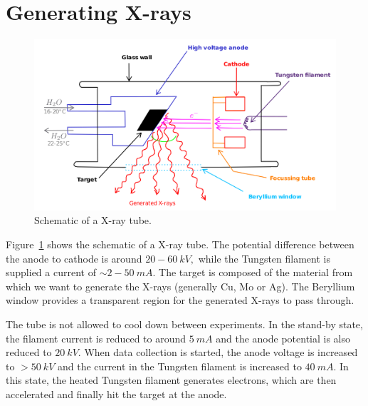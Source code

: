 \section{Generating X-rays}

\begin{figure}
	\centering
	\includegraphics[width=\textwidth]{xray_tube.png}
	\caption{\label{fig:xray_tube}Schematic of a X-ray tube.}
\end{figure}

	Figure~\ref{fig:xray_tube} shows the schematic of a X-ray tube. The potential difference between the anode to cathode is around $20-60~\si{kV},$ while the Tungsten filament is supplied a current of $\sim 2-50~\si{mA}.$ The target is composed of the material from which we want to generate the X-rays (generally Cu, Mo or Ag). The Beryllium window provides a transparent region for the generated X-rays to pass through.
	
	The tube is not allowed to cool down between experiments. In the stand-by state, the filament current is reduced to around $\SI{5}{mA}$ and the anode potential is also reduced to $\SI{20}{kV}.$ When data collection is started, the anode voltage is increased to $>\SI{50}{kV}$ and the current in the Tungsten filament is increased to $\SI{40}{mA}.$ In this state, the heated Tungsten filament generates electrons, which are then accelerated and finally hit the target at the anode.


